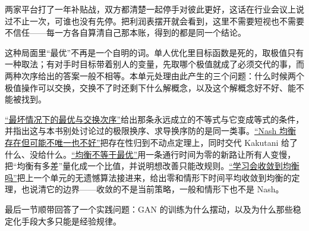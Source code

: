 两家平台打了一年补贴战，双方都清楚一起停手对彼此更好，这话在行业会议上说过不止一次，可谁也没有先停。把利润表摆开就会看到，这里不需要短视也不需要不信任——每一方各自算清自己那本账，得到的都是同一个结论。

这种局面里``最优''不再是一个自明的词。单人优化里目标函数是死的，取极值只有一种取法；有对手时目标带着别人的变量，先取哪个极值就成了必须交代的事，而两种次序给出的答案一般不相等。本单元处理由此产生的三个问题：什么时候两个极值操作可以交换，交换不了时还剩下什么解概念，以及这个解概念好不好、能不能被找到。

\hyperref[sec:17-Constrained-Guarantees/06-Games-and-Equilibria/01]{``最坏情况下的最优与交换次序''}给出那条永远成立的不等式与它变成等式的条件，并指出这与本书别处讨论过的极限换序、求导换序防的是同一类事。\hyperref[sec:17-Constrained-Guarantees/06-Games-and-Equilibria/02]{``Nash 均衡存在但可能不唯一也不好''}把存在性归到不动点定理上，同时交代 Kakutani 给了什么、没给什么。\hyperref[sec:17-Constrained-Guarantees/06-Games-and-Equilibria/03]{``均衡不等于最优''}用一条通行时间为零的新路让所有人变慢，把``均衡有多差''量化成一个比值，并说明想改善只能改规则。\hyperref[sec:17-Constrained-Guarantees/06-Games-and-Equilibria/04]{``学习会收敛到均衡吗''}把上一个单元的无遗憾算法接进来，给出零和情形下时间平均收敛到均衡的定理，也说清它的边界——收敛的不是当前策略，一般和情形下也不是 Nash。

最后一节顺带回答了一个实践问题：GAN 的训练为什么摆动，以及为什么那些稳定化手段大多只能是经验规律。
